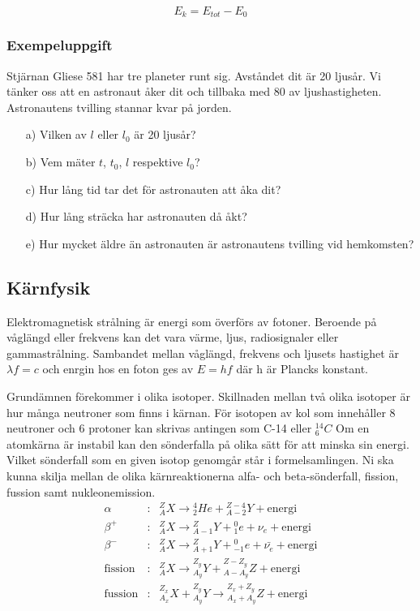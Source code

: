 \documentclass[10pt, titlepage, oneside, a4paper]{article}
\newcommand{\Subsection}[1]{\vspace{-4pt}\subsection{#1}\vspace{-8pt}}
\newcommand{\Subsubsection}[1]{\vspace{-4pt}\subsubsection{#1}\vspace{-8pt}}
\begin{document}
    \begin{equation}
        E_k = E_{tot} - E_{0}
    \end{equation}

    \Subsubsection{Exempeluppgift}
    Stjärnan Gliese 581 har tre planeter runt sig. Avståndet dit är 20
    ljusår. Vi tänker oss att en astronaut åker dit och tillbaka med 80 %
    av ljushastigheten. Astronautens tvilling stannar kvar på jorden.
    \begin{itemize}
        \item[a)] Vilken av $l$ eller $l_0$ är 20 ljusår?
        \item[b)] Vem mäter $t$, $t_0$, $l$ respektive $l_0$?
        \item[c)] Hur lång tid tar det för astronauten att åka dit?
        \item[d)] Hur lång sträcka har astronauten då åkt?
        \item[e)] Hur mycket äldre än astronauten är astronautens tvilling vid hemkomsten?
    \end{itemize}
    \newpage
    \Subsection{Kärnfysik}
    Elektromagnetisk strålning är energi som överförs av fotoner. Beroende på våglängd eller frekvens kan det vara värme,
    ljus, radiosignaler eller gammastrålning. Sambandet mellan våglängd, frekvens och ljusets hastighet är $\lambda f = c$
    och enrgin hos en foton ges av $E = h f$ där h är Plancks konstant.

    Grundämnen förekommer i olika isotoper. Skillnaden mellan två olika isotoper är hur många neutroner som finns i kärnan.
    För isotopen av kol som innehåller 8 neutroner och 6 protoner kan skrivas antingen som C-14 eller ${}_{6}^{14}C$
    Om en atomkärna är instabil kan den sönderfalla på olika sätt för att minska sin energi. Vilket sönderfall som en given
    isotop genomgår står i formelsamlingen. Ni ska kunna skilja mellan de olika kärnreaktionerna alfa- och beta-sönderfall,
    fission, fussion samt nukleonemission.
    \begin{eqnarray}
        \alpha &:& {}_{A}^{Z}X \to  {}_{2}^{4}He + {}_{A-2}^{Z-4}Y + \text{energi}\\
        \beta^+ &:& {}_{A}^{Z}X \to {}_{A-1}^{Z}Y + {}_{1}^{0}e + \nu_e + \text{energi}\\
        \beta^- &:& {}_{A}^{Z}X \to {}_{A+1}^{Z}Y + {}_{-1}^{0}e + \bar{\nu_e} + \text{energi}\\
        \text{fission} &:& {}_{A}^{Z}X \to {}_{A_y}^{Z_y}Y + {}_{A - A_y}^{Z - Z_y}Z + \text{energi}\\
        \text{fussion} &:& {}_{A_x}^{Z_x}X + {}_{A_y}^{Z_y}Y \to {}_{A_x+A_y}^{Z_x+Z_y}Z +\text{energi}
    \end{eqnarray}
\end{document}
